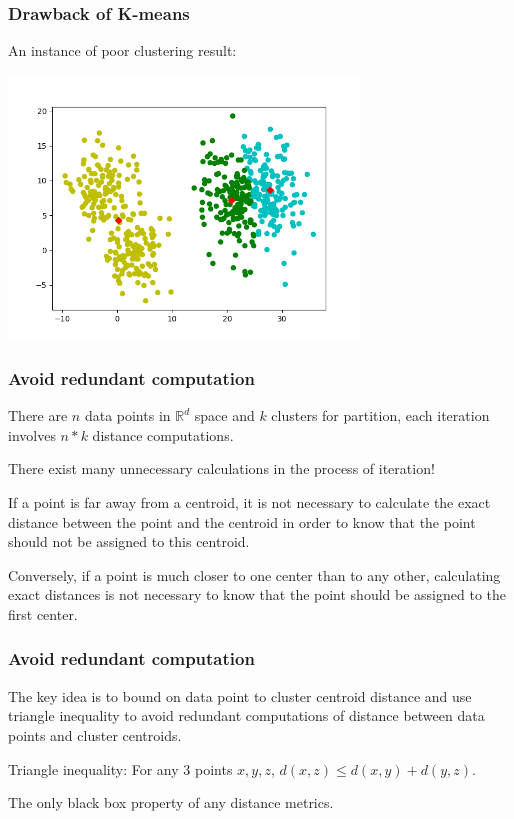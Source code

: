 \documentclass[9pt]{beamer}
\newcommand{\ccp}[1]{{\color{purple}#1}}
\begin{document}
\begin{frame}
	\frametitle{Drawback of K-means}
	An instance of poor clustering result:
	\centerline{\includegraphics[width=0.7\textwidth]{figures/fig.png}}

\end{frame}

\begin{frame}
	\frametitle{Avoid redundant computation}
	There are $n$ data points in $\mathbb{R}^ d$ space and $k$ clusters for partition, each iteration involves $n * k$ distance computations.\par
	There exist many unnecessary calculations in the process of iteration! \par
	\pause
	\par If a point is \ccp{far away from a centroid}, it is not necessary to calculate the exact distance between the point and the centroid in order to know that the point should not be assigned to this centroid.\par
	Conversely, \ccp{if a point is much closer to one center than to any other}, calculating exact distances is not necessary to know that the point should be assigned to the first center.


\end{frame}

\begin{frame}
	\frametitle{Avoid redundant computation}
	The key idea is to \ccp{bound on data point} to cluster centroid distance and use \ccp{triangle inequality} to avoid redundant computations of distance between data points and cluster centroids.
	\begin{lemma}
		Triangle inequality: For any 3 points $x, y, z$, $d(x,z) \le d(x, y) + d(y, z)$.
	\end{lemma}
	The only black box property of any distance metrics.
\end{frame}
\end{document}
